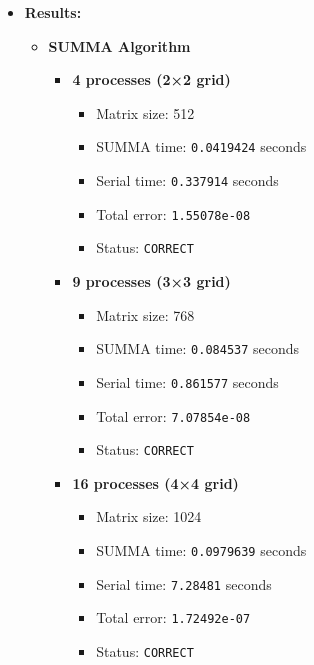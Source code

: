 \documentclass[11pt]{article}
\begin{document}
\begin{itemize}
\begin{itemize}
        \end{itemize}
\item \textbf{Results:}
\begin{itemize}
    \item \textbf{SUMMA Algorithm}
    \begin{itemize}
        \item \textbf{4 processes (2×2 grid)}  
              \begin{itemize}
                  \item Matrix size: 512
                  \item SUMMA time: \texttt{0.0419424} seconds
                  \item Serial time: \texttt{0.337914} seconds
                  \item Total error: \texttt{1.55078e-08}
                  \item Status: \texttt{CORRECT}
              \end{itemize}
        \item \textbf{9 processes (3×3 grid)}  
              \begin{itemize}
                  \item Matrix size: 768
                  \item SUMMA time: \texttt{0.084537} seconds
                  \item Serial time: \texttt{0.861577} seconds
                  \item Total error: \texttt{7.07854e-08}
                  \item Status: \texttt{CORRECT}
              \end{itemize}
        \item \textbf{16 processes (4×4 grid)}  
              \begin{itemize}
                  \item Matrix size: 1024
                  \item SUMMA time: \texttt{0.0979639} seconds
                  \item Serial time: \texttt{7.28481} seconds
                  \item Total error: \texttt{1.72492e-07}
                  \item Status: \texttt{CORRECT}
              \end{itemize}
    \end{itemize}


\end{itemize}
\end{itemize}
\end{document}
